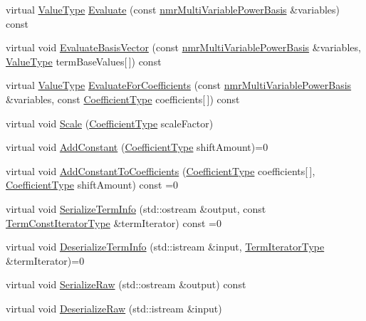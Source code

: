 \begin{DoxyCompactItemize}
\item 
virtual \hyperlink{classnmr_polynomial_base_a72f0bc16b225e4708bcf15a77ba206e3}{Value\-Type} \hyperlink{classnmr_polynomial_container_a8f747bfe057e3056dd1b544367569df3}{Evaluate} (const \hyperlink{classnmr_multi_variable_power_basis}{nmr\-Multi\-Variable\-Power\-Basis} \&variables) const 
\item 
virtual void \hyperlink{classnmr_polynomial_container_adf8130b5dc6b646596e2baf689de9a4b}{Evaluate\-Basis\-Vector} (const \hyperlink{classnmr_multi_variable_power_basis}{nmr\-Multi\-Variable\-Power\-Basis} \&variables, \hyperlink{classnmr_polynomial_base_a72f0bc16b225e4708bcf15a77ba206e3}{Value\-Type} term\-Base\-Values\mbox{[}$\,$\mbox{]}) const 
\item 
virtual \hyperlink{classnmr_polynomial_base_a72f0bc16b225e4708bcf15a77ba206e3}{Value\-Type} \hyperlink{classnmr_polynomial_container_a7cba138156c317147ea5bc49dc10e5be}{Evaluate\-For\-Coefficients} (const \hyperlink{classnmr_multi_variable_power_basis}{nmr\-Multi\-Variable\-Power\-Basis} \&variables, const \hyperlink{classnmr_polynomial_base_a8693efdfc8585ccb49abea69f74f3eef}{Coefficient\-Type} coefficients\mbox{[}$\,$\mbox{]}) const 
\item 
virtual void \hyperlink{classnmr_polynomial_container_aa6584fddf2054bc8ed4fb54a3be19aa3}{Scale} (\hyperlink{classnmr_polynomial_base_a8693efdfc8585ccb49abea69f74f3eef}{Coefficient\-Type} scale\-Factor)
\item 
virtual void \hyperlink{classnmr_polynomial_container_a883f221d9a4428feaa207f98470f721a}{Add\-Constant} (\hyperlink{classnmr_polynomial_base_a8693efdfc8585ccb49abea69f74f3eef}{Coefficient\-Type} shift\-Amount)=0
\item 
virtual void \hyperlink{classnmr_polynomial_container_a8495f9383c2168896c693bc954238845}{Add\-Constant\-To\-Coefficients} (\hyperlink{classnmr_polynomial_base_a8693efdfc8585ccb49abea69f74f3eef}{Coefficient\-Type} coefficients\mbox{[}$\,$\mbox{]}, \hyperlink{classnmr_polynomial_base_a8693efdfc8585ccb49abea69f74f3eef}{Coefficient\-Type} shift\-Amount) const =0
\item 
virtual void \hyperlink{classnmr_polynomial_container_aa8d77ebaccb2e9849b8921cf4a7408a8}{Serialize\-Term\-Info} (std\-::ostream \&output, const \hyperlink{classnmr_polynomial_container_aba8d31506ab6a487fdc4fe2815469442}{Term\-Const\-Iterator\-Type} \&term\-Iterator) const =0
\item 
virtual void \hyperlink{classnmr_polynomial_container_aa1d8ad137c0dce9e4d3b4f576ca4c0e8}{Deserialize\-Term\-Info} (std\-::istream \&input, \hyperlink{classnmr_polynomial_container_a276e57445d038e8a16462f47b85719a3}{Term\-Iterator\-Type} \&term\-Iterator)=0
\item 
virtual void \hyperlink{classnmr_polynomial_container_a1fb16b0f2382343c1313b5fb2c6d5e6e}{Serialize\-Raw} (std\-::ostream \&output) const 
\item 
virtual void \hyperlink{classnmr_polynomial_container_a2a166a5b7f970b2fec4a374fcfc1de44}{Deserialize\-Raw} (std\-::istream \&input)
\end{DoxyCompactItemize}
